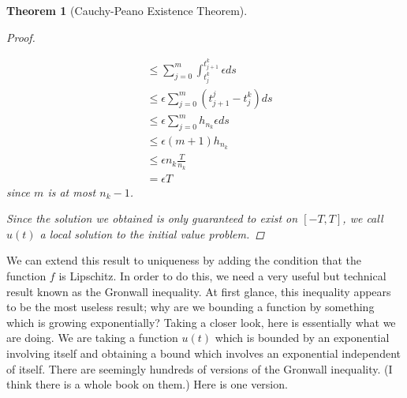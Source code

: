 \documentclass[12pt]{amsart}         %
\newtheorem{theorem}{Theorem}[section]
\theoremstyle{remark}
\begin{document}
\begin{theorem}[Cauchy-Peano Existence Theorem]
\begin{proof}
\begin{enumerate}
\begin{align*}
    &\leq \sum_{j=0}^{m} \int_{t_j^k}^{t_{j+1}^k} \epsilon ds \\
    &\leq \epsilon \sum_{j=0}^m (t_{j+1}^j - t_j^k) ds \\
    &\leq \epsilon \sum_{j=0}^m h_{n_k} \epsilon ds \\
    &\leq \epsilon (m+1) h_{n_k} \\
    &\leq \epsilon n_k \frac{T}{n_k} \\
    &= \epsilon T
    \end{align*}
    since $m$ is at most $n_k - 1$.
\end{enumerate}
Since the solution we obtained is only guaranteed to exist on $[-T, T]$, we call $u(t)$ a local solution to the initial value problem.
\end{proof}
\end{theorem}


We can extend this result to uniqueness by adding the condition that the function $f$ is Lipschitz. In order to do this, we need a very useful but technical result known as the Gronwall inequality. At first glance, this inequality appears to be the most useless result; why are we bounding a function by something which is growing exponentially? Taking a closer look, here is essentially what we are doing. We are taking a function $u(t)$ which is bounded by an exponential involving itself and obtaining a bound which involves an exponential independent of itself. There are seemingly hundreds of versions of the Gronwall inequality. (I think there is a whole book on them.) Here is one version.
\end{document}
